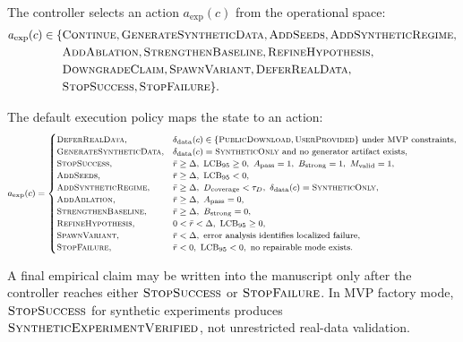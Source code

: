 \documentclass[11pt]{article}
\begin{document}
The controller selects an action $a_{\text{exp}}(c)$ from the operational space:
$$
\begin{aligned}
a_{\text{exp}}(c) \in \{ &\textsc{Continue}, \textsc{GenerateSyntheticData}, \textsc{AddSeeds}, \textsc{AddSyntheticRegime}, \\
&\textsc{AddAblation}, \textsc{StrengthenBaseline}, \textsc{RefineHypothesis}, \\
&\textsc{DowngradeClaim}, \textsc{SpawnVariant}, \textsc{DeferRealData}, \\
&\textsc{StopSuccess}, \textsc{StopFailure} \}.
\end{aligned}
$$

The default execution policy maps the state to an action:
$$
\footnotesize
\begin{aligned}
a_{\text{exp}}(c)=
\begin{cases}
\textsc{DeferRealData}, & \delta_{\text{data}}(c)\in\{\textsc{PublicDownload},\textsc{UserProvided}\}\ \text{under MVP constraints},\\
\textsc{GenerateSyntheticData}, & \delta_{\text{data}}(c)=\textsc{SyntheticOnly}\ \text{and no generator artifact exists},\\
\textsc{StopSuccess}, & \bar{r}\geq\Delta,\ \operatorname{LCB}_{95}\geq0,\ A_{\text{pass}}=1,\ B_{\text{strong}}=1,\ M_{\text{valid}}=1,\\
\textsc{AddSeeds}, & \bar{r}\geq\Delta,\ \operatorname{LCB}_{95}<0,\\
\textsc{AddSyntheticRegime}, & \bar{r}\geq\Delta,\ D_{\text{coverage}}<\tau_D,\ \delta_{\text{data}}(c)=\textsc{SyntheticOnly},\\
\textsc{AddAblation}, & \bar{r}\geq\Delta,\ A_{\text{pass}}=0,\\
\textsc{StrengthenBaseline}, & \bar{r}\geq\Delta,\ B_{\text{strong}}=0,\\
\textsc{RefineHypothesis}, & 0<\bar{r}<\Delta,\ \operatorname{LCB}_{95}\geq0,\\
\textsc{SpawnVariant}, & \bar{r}<\Delta,\ \text{error analysis identifies localized failure},\\
\textsc{StopFailure}, & \bar{r}<0,\ \operatorname{LCB}_{95}<0,\ \text{no repairable mode exists}.
\end{cases}
\end{aligned}
$$

A final empirical claim may be written into the manuscript only after the controller reaches either $\textsc{StopSuccess}$ or $\textsc{StopFailure}$. In MVP factory mode, $\textsc{StopSuccess}$ for synthetic experiments produces $\textsc{SyntheticExperimentVerified}$, not unrestricted real-data validation.
\end{document}
